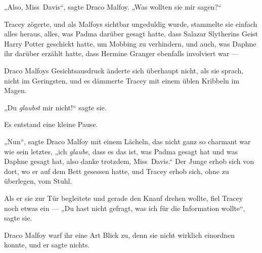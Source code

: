 „Also, Miss~Davis“, sagte Draco Malfoy.
„Was wollten sie mir sagen?“

Tracey zögerte, und als Malfoys sichtbar ungeduldig wurde, stammelte sie einfach alles heraus, alles, was Padma darüber gesagt hatte, dass Salazar Slytherins Geist Harry Potter geschickt hatte, um Mobbing zu verhindern, und auch, was Daphne ihr darüber erzählt hatte, dass Hermine Granger ebenfalls involviert war —

Draco Malfoys Gesichtsausdruck änderte sich überhaupt nicht, als sie sprach, nicht im Geringsten, und es dämmerte Tracey mit einem üblen Kribbeln im Magen.

„Du \emph{glaubst} mir nicht!“ sagte sie.

Es entstand eine kleine Pause.

„Nun“, sagte Draco Malfoy mit einem Lächeln, das nicht ganz so charmant war wie sein letztes, „ich \emph{glaube}, dass es das ist, was Padma gesagt hat und was Daphne gesagt hat, also danke trotzdem, Miss~Davis.“ Der Junge erhob sich von dort, wo er auf dem Bett gesessen hatte, und Tracey erhob sich, ohne zu überlegen, vom Stuhl.

Als er sie zur Tür begleitete und gerade den Knauf drehen wollte, fiel Tracey noch etwas ein —
„Du hast nicht gefragt, was ich für die Information wollte“, sagte sie.

Draco Malfoy warf ihr eine Art Blick zu, denn sie nicht wirklich einordnen konnte, und er sagte nichts.

